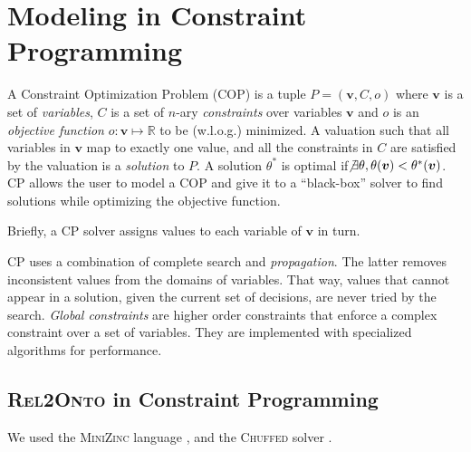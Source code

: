\documentclass[letterpaper]{article} %
\newcommand{\minizinc}{\textsc{MiniZinc}}
\newcommand{\chuffed}{\textsc{Chuffed}}
\newcommand{\relonto}{\textsc{Rel2Onto}}
\newcommand{\ignore}[1]{}
\newcommand{\forijcai}[1]{}
\begin{document}
\section{Modeling in Constraint Programming \label{SEC:CP}}

A Constraint Optimization Problem (COP) is a tuple $P=(\boldsymbol{v},C,o)$ 
where $\boldsymbol{v}$ is a 
set of \emph{variables}, $C$ is a set of $n$-ary 
\emph{constraints} over variables $\boldsymbol{v}$ and $o$ is an 
\emph{objective function} $o : \boldsymbol{v} \mapsto \mathbb{R}$ to be 
(w.l.o.g.) minimized. 
A valuation such that all variables in $\boldsymbol{v}$ map 
to exactly one value, and all the constraints in $C$ are satisfied by the 
valuation is a \emph{solution} to $P$. A solution $\theta^*$ is optimal if$\not 
\exists \theta, \theta(\boldsymbol{v}) < \theta^*(\boldsymbol{v})$.
CP allows the user to model a COP and give it 
to a ``black-box'' solver to find solutions while optimizing 
the objective function\forijcai{ (and prove optimality)}.

Briefly, a CP solver assigns values to each variable of 
$\boldsymbol{v}$ in turn. 
\ignore{At each iteration it will check whether any 
constraint in $C$ is violated, in which case it will backtrack to change its 
last decision. \ignore{The choice of the order of the variables to be assigned, 
and the 
choice of the value to be assigned to each variable is called the \emph{search 
strategy}.}}
CP uses a combination of complete search and \emph{propagation}. The latter
removes inconsistent values 
from the domains of variables. That way, values that cannot appear in a 
solution, given the current set of decisions, are never tried by the search. 
\emph{Global constraints} are higher order constraints that enforce a 
complex 
constraint over a set of variables. They are implemented with 
specialized algorithms for performance.


\subsection{\relonto{} in Constraint Programming\label{SEC:rel2ontocp}}
We used the \minizinc{} language 
\cite{minizinc}, and the 
\chuffed{} solver \cite{chu2011improving}. \forijcai{ because it has a global constraint 
implemented for Steiner 
Tree Problems \cite{deuna2016steiner}. The model can be found in Appendix \ref{Ann:MZ}}
\end{document}
